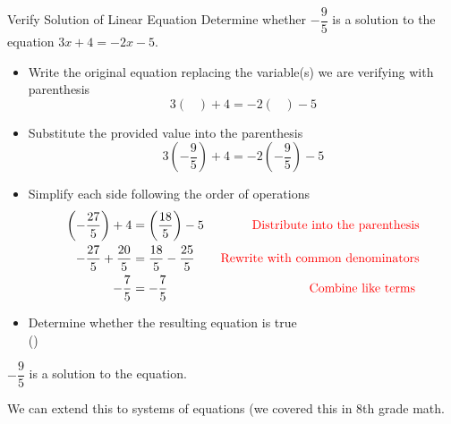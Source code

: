 \begin{example}{Verify Solution of Linear Equation}{}
    Determine whether $-\dfrac{9}{5}$ is a solution to the equation $3x+4=-2x-5$.
	\begin{itemize}
		\item[] Write the original equation replacing the variable(s) we are verifying with parenthesis
              \begin{equation*}
                  3\left(\;\;\;\right)+4=-2\left(\;\;\;\right)-5
              \end{equation*}
 		\item[] Substitute the provided value into the parenthesis
              \begin{equation*}
                  3\left(-\dfrac{9}{5}\right)+4=-2\left(-\dfrac{9}{5}\right)-5
              \end{equation*}    
            \item[] Simplify each side following the order of operations
              \begin{align*}
                  \left(-\dfrac{27}{5}\right)+4&=\left(\dfrac{18}{5}\right)-5 &\textcolor{red}{\textrm{   Distribute into the parenthesis}}\\
                  -\dfrac{27}{5}+\dfrac{20}{5}&=\dfrac{18}{5}-\dfrac{25}{5} &\textcolor{red}{\textrm{   Rewrite with common denominators}}\\
                  -\dfrac{7}{5}&= -\dfrac{7}{5} &\textcolor{red}{\textrm{  Combine like terms }}
              \end{align*}
            \item[]Determine whether the resulting equation is true\\
            (\true)
	\end{itemize}
 $-\dfrac{9}{5}$ is a solution to the equation.
\end{example}
\newpage
We can extend this to systems of equations (we covered this in 8th grade math.
